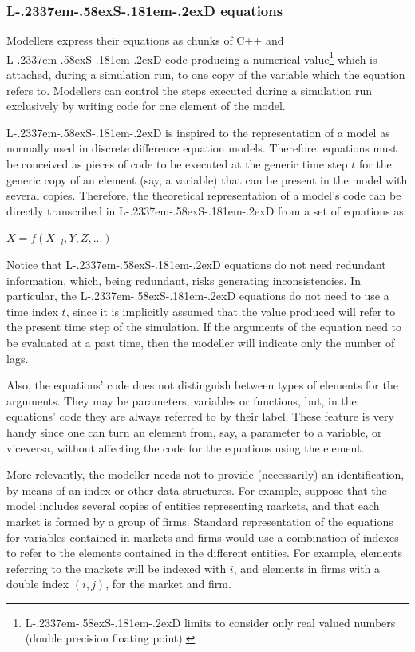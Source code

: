 \documentclass [11pt,a4paper] {book}
\def\LsD{{L\kern-.2337em\lower-.58ex\hbox{S}\kern-.181em\lower-.2ex\hbox{D}}\xspace}
\begin{document}
\subsubsection{\LsD equations}

Modellers express their equations as chunks of C++ and \LsD code producing a numerical
value\footnote{\LsD limits to consider only real valued numbers (double precision floating
point).} which is attached, during a simulation run, to one copy of the variable which
the equation refers to. Modellers can control the steps executed during a simulation run exclusively by writing code for one element of the model. 

\LsD is inspired to the representation of a model as normally used in discrete difference equation models. Therefore, equations must be conceived as pieces of code to be executed at the generic time step $t$ for the generic copy of an element (say, a variable) that can be present in the model with several copies. Therefore, the theoretical representation of a model's code can be directly transcribed in \LsD from a set of equations as:

$X=f(X_{-l}, Y, Z, ...)$

Notice that \LsD equations do not need redundant information, which, being redundant, risks generating inconsistencies. In particular, the \LsD equations do not need to use a time index $t$, since it is implicitly assumed that the value produced will refer to the present time step of the simulation. If the arguments of the equation need to be evaluated at a past time, then the modeller will indicate only the number of lags.

Also, the equations' code does not distinguish between types of elements for the arguments. They may be parameters, variables or functions, but, in the equations' code they are always referred to by their label. These feature is very handy since one can turn an element from, say, a parameter to a variable, or viceversa, without affecting the code for the equations using the element.


More relevantly, the modeller needs not to provide (necessarily) an identification, by means of an index or other data structures. For example, suppose that the model includes several copies of entities representing markets, and that each market is formed by a group of firms. Standard representation of the equations for variables contained in markets and firms would use a combination of indexes to refer to the elements contained in the different entities. For example, elements referring to the markets will be indexed with $i$, and elements in firms with a double index $(i,j)$, for the market and firm.
\end{document}
